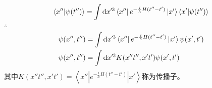 \documentclass[12pt]{article}
\numberwithin{equation}{section}	 %
\begin{document}
\begin{spacing}{1.5}
\begin{equation}
\left<x''|\psi(t'')\right> = \int\mathop{}\!\mathrm{d} x'^{3}\left<x''\right| e^{-\frac{i}{\hbar}H(t''-t')} \left|x'\right>\left<x'|\psi(t'')\right>
\end{equation}
$\therefore$
\begin{equation}
\begin{aligned}
\psi(x'',t'') &= \int\mathop{}\!\mathrm{d} x'^{3}\left<x''\right| e^{-\frac{i}{\hbar}H(t''-t')} \left|x'\right> \psi(x',t') \\
\psi(x'',t'') &= \int\mathop{}\!\mathrm{d} x'^{3}K(x''t'',x't')\psi(x',t')
\end{aligned}
\end{equation}
其中$\displaystyle  K(x''t'',x't') =\left<x''\left|e^{-\frac{i}{\hbar}H(t''-t')}\right|x'\right> $称为传播子。



\newpage

\end{spacing}
\end{document}
